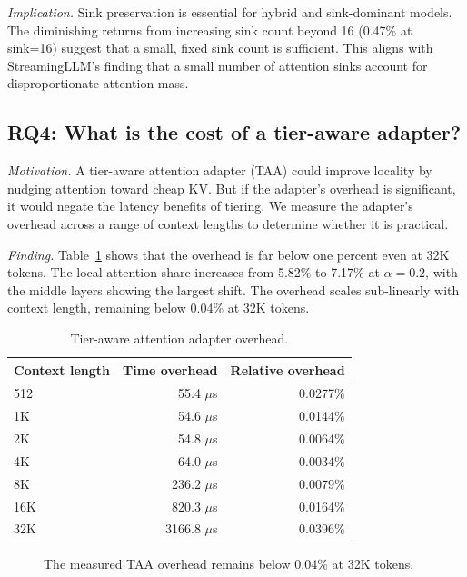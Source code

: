 \documentclass[11pt]{article}
\newcommand{\taa}{TAA}
\newcommand{\pct}{\%}
\theoremstyle{definition}
\theoremstyle{plain}
\begin{document}
\emph{Implication.}  Sink preservation is essential for hybrid and sink-dominant models.  The diminishing returns from increasing sink count beyond 16 (0.47\pct{} at sink=16) suggest that a small, fixed sink count is sufficient.  This aligns with StreamingLLM's finding that a small number of attention sinks account for disproportionate attention mass.

\subsection{RQ4: What is the cost of a tier-aware adapter?}
\label{sec:rq4}

\emph{Motivation.}  A tier-aware attention adapter (\taa) could improve locality by nudging attention toward cheap KV.  But if the adapter's overhead is significant, it would negate the latency benefits of tiering.  We measure the adapter's overhead across a range of context lengths to determine whether it is practical.

\emph{Finding.}  Table~\ref{tab:taa} shows that the overhead is far below one percent even at 32K tokens.  The local-attention share increases from 5.82\pct{} to 7.17\pct{} at $\alpha=0.2$, with the middle layers showing the largest shift.  The overhead scales sub-linearly with context length, remaining below 0.04\pct{} at 32K tokens.

\begin{table}[t]
\centering
\caption{Tier-aware attention adapter overhead.}
\label{tab:taa}
\small
\begin{tabular}{lrr}
\toprule
Context length & Time overhead & Relative overhead \\
\midrule
512 & 55.4 $\mu$s & 0.0277\pct{} \\
1K & 54.6 $\mu$s & 0.0144\pct{} \\
2K & 54.8 $\mu$s & 0.0064\pct{} \\
4K & 64.0 $\mu$s & 0.0034\pct{} \\
8K & 236.2 $\mu$s & 0.0079\pct{} \\
16K & 820.3 $\mu$s & 0.0164\pct{} \\
32K & 3166.8 $\mu$s & 0.0396\pct{} \\
\bottomrule
\end{tabular}
\end{table}

\begin{figure}[t]
\centering
{}
\caption{The measured \taa{} overhead remains below 0.04\pct{} at 32K tokens.}
\label{fig:taa-overhead}
\end{figure}
\end{document}
